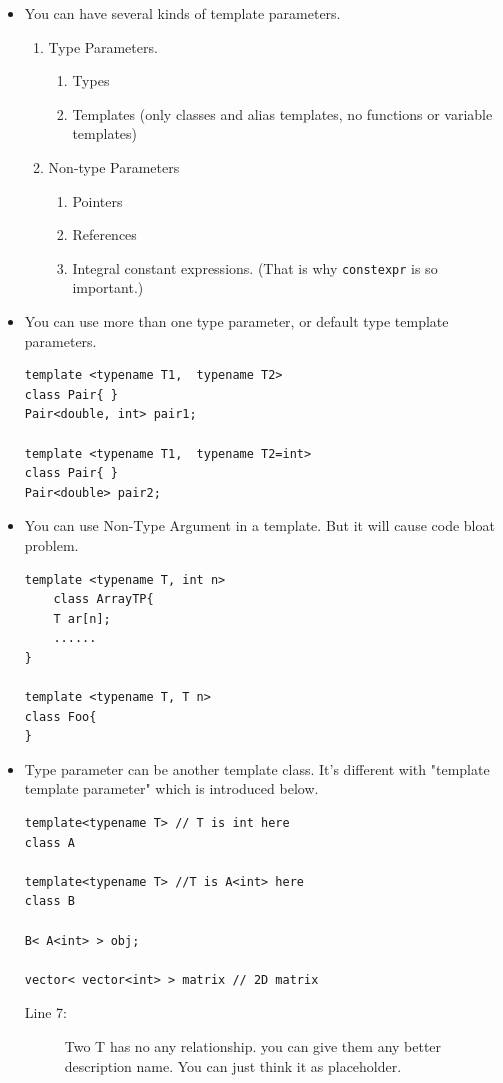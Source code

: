 \documentclass[a4paper,11pt,twoside]{book}
\begin{document}
\begin{itemize}
\item You can have several kinds of template parameters.
\begin{enumerate}
\item  Type Parameters.
  	\begin{enumerate}
   	\item Types
    \item Templates (only classes and alias templates, no functions or variable templates)
	\end{enumerate}

\item Non-type Parameters
   \begin{enumerate}
	\item Pointers
	\item References
	\item Integral constant expressions. (That is why \texttt{constexpr} is so important.)
	\end{enumerate}
\end{enumerate}

\item You can use more than one type parameter, or default type template parameters.
\begin{lstlisting}[numbers=none]
template <typename T1,  typename T2>
class Pair{ }
Pair<double, int> pair1;

template <typename T1,  typename T2=int>
class Pair{ }
Pair<double> pair2;
\end{lstlisting}

\item You can use Non-Type Argument in a template. But it will cause code bloat problem. 
\begin{lstlisting}[numbers=none]
template <typename T, int n>
	class ArrayTP{
	T ar[n];
	......
}

template <typename T, T n>
class Foo{
}
\end{lstlisting}

\item Type parameter can be another template class.  It's different with "template template parameter" which is introduced below.
\begin{lstlisting}[numbers=none]
template<typename T> // T is int here
class A

template<typename T> //T is A<int> here
class B

B< A<int> > obj;

vector< vector<int> > matrix // 2D matrix
\end{lstlisting}
\begin{description}
	\item[Line 7:] Two T has no any relationship. you can give them any better description name. You can just think it as placeholder.
\end{description}


\end{itemize}
\end{document}
